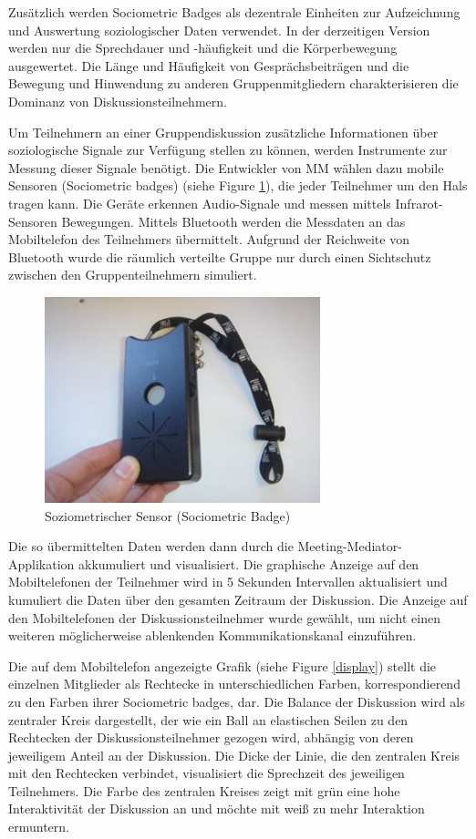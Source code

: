 Zu\-sätz\-lich werden Sociometric Badges als dezentrale Einheiten zur
Aufzeichnung und Auswertung soziologischer Daten verwendet. In der derzeitigen
Version werden nur die Sprechdauer und -häufigkeit und die Körperbewegung
ausgewertet.
Die Länge und Häufigkeit von Ge\-sprächs\-bei\-trä\-gen und die Bewegung und
Hinwendung zu anderen Gruppenmitgliedern charakterisieren die Dominanz von
Diskussionsteilnehmern.

Um Teilnehmern an einer Gruppendiskussion zusätzliche Informationen über
soziologische Signale zur Verfügung stellen zu können, werden Instrumente zur
Messung dieser Signale benötigt. Die Entwickler von MM wählen dazu mobile
Sensoren (Sociometric badges) (siehe Figure \ref{badge}), die jeder Teilnehmer
um den Hals tragen kann.
Die Geräte erkennen Audio-Signale und messen mittels Infrarot-Sen\-so\-ren
Bewegungen. Mittels Bluetooth werden die Messdaten an das Mobiltelefon des
Teilnehmers übermittelt. Aufgrund der Reichweite von Bluetooth wurde die
räumlich verteilte Gruppe nur durch einen Sichtschutz zwischen den
Gruppenteilnehmern simuliert.

\begin{figure}[htp]
\centering
\includegraphics[width=8cm]{sociometricbadge.jpg}
\caption{Soziometrischer Sensor (Sociometric Badge) \protect\cite{MITbadge}}
\label{badge}
\end{figure}

Die so übermittelten Daten werden dann durch die Meeting-Mediator-Applikation
akkumuliert und visualisiert.
Die graphische Anzeige auf den Mobiltelefonen der Teilnehmer wird in 5 Sekunden
Intervallen aktualisiert und kumuliert die Daten über den gesamten Zeitraum der
Diskussion.
Die Anzeige auf den Mobiltelefonen der Diskussionsteilnehmer wurde gewählt, um
nicht einen weiteren mög\-li\-cher\-wei\-se ablenkenden Kommunikationskanal
einzuführen.

Die auf dem Mobiltelefon angezeigte Grafik (siehe Figure \ref{display}) stellt
die einzelnen Mitglieder als Rechtecke in unterschiedlichen Farben,
korrespondierend zu den Farben ihrer Sociometric badges, dar. Die Balance der
Diskussion wird als zentraler Kreis dargestellt, der wie ein Ball an elastischen
Seilen zu den Rechtecken der Diskussionsteilnehmer gezogen wird, abhängig von
deren jeweiligem Anteil an der Diskussion. Die Dicke der Linie, die den
zentralen Kreis mit den Rechtecken verbindet, visualisiert die Sprechzeit des
jeweiligen Teilnehmers. Die Farbe des zentralen Kreises zeigt mit grün eine hohe
Interaktivität der Diskussion an und möchte mit weiß zu mehr Interaktion
ermuntern.

